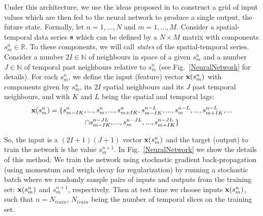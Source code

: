 \documentclass[journal]{IEEEtran}
\begin{document}
Under this architecture, we use the ideas proposed in \cite{Parlitz2000NonlinearPO} to construct a grid of input values
which are then fed to the neural network to produce a single output, the future state. Formally,
let $n=1,...,N$ and $m=1,...,M$.
Consider a spatial-temporal data series ${\bf s}$ which can be
defined by a $N\times M$ matrix with components
$s^n_m \in \mathbb{R}$. To these components, we will call {\em states} of the spatial-temporal series.
Consider a number $2I\in \mathbb{N}$ of neighbours in space of a given
$s^n_m$ and a number $J\in \mathbb{N}$ of temporal past neighbours relative to $s^n_m$ (see Fig.\ \ref{NeuralNetwork} for details).
For each $s^n_m$, we define the input (feature) vector ${\bf x} (s^n_m)$ with components given by
$s^n_m$, its  $2I$ spatial neighbours and its $J$ past temporal
neighbours, and with $K$ and $L$ being the spatial and temporal lags:
\begin{multline}
{\bf x}(s^n_m)=\{s^n_{m-I K }, ...,s^n_m, ..., s^n_{m+I K},
s^{n-L}_{m-I K},..., s^{n-L}_{m},..., s^{n-L}_{m+I K},
...\\ \cap
s^{n-J L}_{m-I K},..., s^{n-J L}_{m},..., s^{n-J L}_{m+I K} \}
\label{embedding}
\end{multline}

So, the input is a
$(2 I+1)(J+1)$ vector ${\bf x}(s^n_m)$ and the target (output) to train the network is the value $s^{n+1}_{m}$.
In Fig.\ \ref{NeuralNetwork} we show the details of this method. We train the network using stochastic gradient
back-propagation (using momentum and weigh decay for regularization) by running a stochastic batch
where we randomly sample pairs of inputs and outputs from the training set: ${\bf x}(s^n_m)$ and $s^{n+1}_{m}$, respectively. Then at test time
we choose inputs ${\bf x}(s^n_m)$, such that $n=N_{train}$, $N_{train}$ being the number of temporal slices on the training set.
\end{document}
